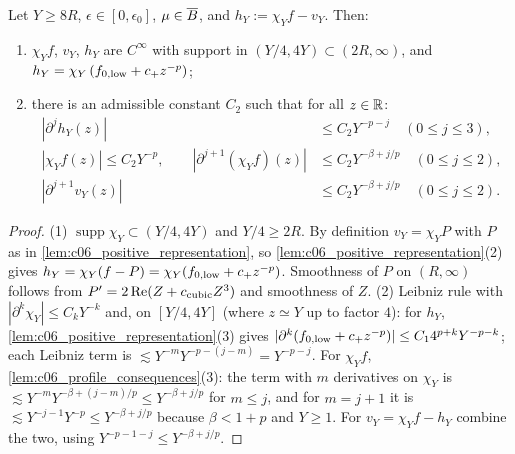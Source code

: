 \begin{lemma}
  \label{lem:c06_localized_bounds}
  Let $Y\ge8R$, $\epsilon\in[0,\epsilon_0]$, $\mu\in\overline{B}$, and $h_Y:=\chi_Yf-v_Y$. Then:
  \begin{enumerate}
    \item $\chi_Yf$, $v_Y$, $h_Y$ are $C^\infty$ with support in $(Y/4,4Y)\subset(2R,\infty)$, and
          $h_Y=\chi_Y\,(f_{0,\textup{low}}+c_+z^{-p})$;
    \item there is an admissible constant $C_2$ such that for all $z\in\mathbb{R}$:
      \begin{align*}
        |\partial^jh_Y(z)|&\le C_2Y^{-p-j}\quad(0\le j\le3),\\
        |\chi_Yf(z)|\le C_2Y^{-p},\qquad |\partial^{j+1}(\chi_Yf)(z)|&\le C_2Y^{-\beta+j/p}\quad(0\le j\le2),\\
        |\partial^{j+1}v_Y(z)|&\le C_2Y^{-\beta+j/p}\quad(0\le j\le2).
      \end{align*}
  \end{enumerate}
\end{lemma}
\begin{proof}
  (1) $\operatorname{supp}\chi_Y\subset(Y/4,4Y)$ and $Y/4\ge2R$. By definition
  $v_Y=\chi_YP$ with $P$ as in \cref{lem:c06_positive_representation}, so
  \cref{lem:c06_positive_representation}(2) gives $h_Y=\chi_Y(f-P)=\chi_Y(f_{0,\textup{low}}+c_+z^{-p})$. Smoothness of $P$
  on $(R,\infty)$ follows from $P'=2\operatorname{Re}(Z+c_{\textup{cubic}}Z^3)$ and smoothness of $Z$.
  (2) Leibniz rule with $|\partial^k\chi_Y|\le C_kY^{-k}$ and, on $[Y/4,4Y]$ (where $z\simeq Y$ up to factor $4$):
  for $h_Y$, \cref{lem:c06_positive_representation}(3) gives $|\partial^k(f_{0,\textup{low}}+c_+z^{-p})|\le C_14^{p+k}Y^{-p-k}$;
  each Leibniz term is $\lesssim Y^{-m}Y^{-p-(j-m)}=Y^{-p-j}$.
  For $\chi_Yf$, \cref{lem:c06_profile_consequences}(3): the term with $m$ derivatives on $\chi_Y$ is
  $\lesssim Y^{-m}Y^{-\beta+(j-m)/p}\le Y^{-\beta+j/p}$ for $m\le j$, and for $m=j+1$ it is
  $\lesssim Y^{-j-1}Y^{-p}\le Y^{-\beta+j/p}$ because $\beta<1+p$ and $Y\ge1$.
  For $v_Y=\chi_Yf-h_Y$ combine the two, using $Y^{-p-1-j}\le Y^{-\beta+j/p}$.
\end{proof}

